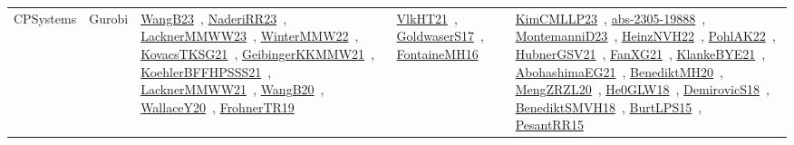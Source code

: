{\begin{longtable}{lp{3cm}>{\raggedright\arraybackslash}p{6cm}>{\raggedright\arraybackslash}p{6cm}>{\raggedright\arraybackslash}p{8cm}}
CPSystems & Gurobi & \href{papers/WangB23.pdf}{WangB23}~\cite{WangB23}, \href{articles/NaderiRR23.pdf}{NaderiRR23}~\cite{NaderiRR23}, \href{articles/LacknerMMWW23.pdf}{LacknerMMWW23}~\cite{LacknerMMWW23}, \href{papers/WinterMMW22.pdf}{WinterMMW22}~\cite{WinterMMW22}, \href{papers/KovacsTKSG21.pdf}{KovacsTKSG21}~\cite{KovacsTKSG21}, \href{papers/GeibingerKKMMW21.pdf}{GeibingerKKMMW21}~\cite{GeibingerKKMMW21}, \href{articles/KoehlerBFFHPSSS21.pdf}{KoehlerBFFHPSSS21}~\cite{KoehlerBFFHPSSS21}, \href{papers/LacknerMMWW21.pdf}{LacknerMMWW21}~\cite{LacknerMMWW21}, \href{papers/WangB20.pdf}{WangB20}~\cite{WangB20}, \href{articles/WallaceY20.pdf}{WallaceY20}~\cite{WallaceY20}, \href{papers/FrohnerTR19.pdf}{FrohnerTR19}~\cite{FrohnerTR19} & \href{articles/VlkHT21.pdf}{VlkHT21}~\cite{VlkHT21}, \href{papers/GoldwaserS17.pdf}{GoldwaserS17}~\cite{GoldwaserS17}, \href{papers/FontaineMH16.pdf}{FontaineMH16}~\cite{FontaineMH16} & \href{papers/KimCMLLP23.pdf}{KimCMLLP23}~\cite{KimCMLLP23}, \href{articles/abs-2305-19888.pdf}{abs-2305-19888}~\cite{abs-2305-19888}, \href{articles/MontemanniD23.pdf}{MontemanniD23}~\cite{MontemanniD23}, \href{articles/HeinzNVH22.pdf}{HeinzNVH22}~\cite{HeinzNVH22}, \href{articles/PohlAK22.pdf}{PohlAK22}~\cite{PohlAK22}, \href{articles/HubnerGSV21.pdf}{HubnerGSV21}~\cite{HubnerGSV21}, \href{articles/FanXG21.pdf}{FanXG21}~\cite{FanXG21}, \href{papers/KlankeBYE21.pdf}{KlankeBYE21}~\cite{KlankeBYE21}, \href{articles/AbohashimaEG21.pdf}{AbohashimaEG21}~\cite{AbohashimaEG21}, \href{articles/BenediktMH20.pdf}{BenediktMH20}~\cite{BenediktMH20}, \href{articles/MengZRZL20.pdf}{MengZRZL20}~\cite{MengZRZL20}, \href{papers/He0GLW18.pdf}{He0GLW18}~\cite{He0GLW18}, \href{papers/DemirovicS18.pdf}{DemirovicS18}~\cite{DemirovicS18}, \href{papers/BenediktSMVH18.pdf}{BenediktSMVH18}~\cite{BenediktSMVH18}, \href{papers/BurtLPS15.pdf}{BurtLPS15}~\cite{BurtLPS15}, \href{papers/PesantRR15.pdf}{PesantRR15}~\cite{PesantRR15}\\

\end{longtable}}
